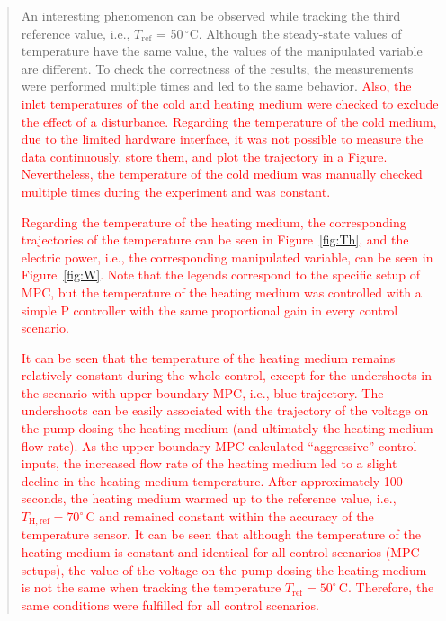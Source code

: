 \documentclass[a4paper,10pt]{article}
\newcommand{\change}[1]{\textcolor{red}{#1}}
\begin{document}
{		\begin{quote}
			An interesting phenomenon can be observed while tracking the third reference value, i.e., $T_{\mathrm{ref}}$ = 50\,$^{\circ}\mathrm{C}$. Although the steady-state values of temperature have the same value, the values of the manipulated variable are different. To check the correctness of the results, the measurements were performed multiple times and led to the same behavior. \change{Also, the inlet temperatures of the cold and heating medium were checked to exclude the effect of a disturbance. Regarding the temperature of the cold medium, due to the limited hardware interface, it was not possible to measure the data continuously, store them, and plot the trajectory in a Figure. Nevertheless, the temperature of the cold medium was manually checked multiple times during the experiment and was constant.} 
			
			\change{Regarding the temperature of the heating medium, the corresponding trajectories of the temperature can be seen in Figure~\ref{fig:Th}, and the electric power, i.e., the corresponding manipulated variable, can be seen in Figure~\ref{fig:W}. Note that the legends correspond to the specific setup of MPC, but the temperature of the heating medium was controlled with a simple P controller with the same proportional gain in every control scenario.} 
			
			\change{It can be seen that the temperature of the heating medium remains relatively constant during the whole control, except for the undershoots in the scenario with upper boundary MPC, i.e., blue trajectory. The undershoots can be easily associated with the trajectory of the voltage on the pump dosing the heating medium (and ultimately the heating medium flow rate). As the upper boundary MPC calculated ``aggressive'' control inputs, the increased flow rate of the heating medium led to a slight decline in the heating medium temperature. After approximately 100 seconds, the heating medium warmed up to the reference value, i.e., $T_{\mathrm{H, ref}} = 70^{\circ}$\,C and remained constant within the accuracy of the temperature sensor. It can be seen that although the temperature of the heating medium is constant and identical for all control scenarios (MPC setups), the value of the voltage on the pump dosing the heating medium is not the same when tracking the temperature $T_{\mathrm{ref}} = 50^{\circ}$\,C. Therefore, the same conditions were fulfilled for all control scenarios.} 
			

\end{quote}}
\end{document}
